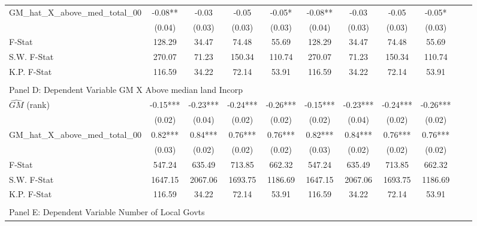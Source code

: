 \begin{table}[htbp]
\begin{threeparttable}
\begin{tabular}{l*{10}{c}}
\addlinespace
GM\_hat\_X\_above\_med\_total\_00&      -0.08** &      -0.03   &      -0.05   &      -0.05*  &      -0.08** &      -0.03   &      -0.05   &      -0.05*  \\
                &     (0.04)   &     (0.03)   &     (0.03)   &     (0.03)   &     (0.04)   &     (0.03)   &     (0.03)   &     (0.03)   \\
\midrule
F-Stat          &     128.29   &      34.47   &      74.48   &      55.69   &     128.29   &      34.47   &      74.48   &      55.69   \\
S.W. F-Stat     &     270.07   &      71.23   &     150.34   &     110.74   &     270.07   &      71.23   &     150.34   &     110.74   \\
K.P. F-Stat     &     116.59   &      34.22   &      72.14   &      53.91   &     116.59   &      34.22   &      72.14   &      53.91   \\
\cmidrule[\heavyrulewidth](lr){1-9} \\ \cmidrule[\heavyrulewidth](lr){1-9}
\multicolumn{8}{l}{Panel D: Dependent Variable GM X Above median land Incorp}\\
\cmidrule(lr){1-9}
$\hat{GM}$ (rank)&      -0.15***&      -0.23***&      -0.24***&      -0.26***&      -0.15***&      -0.23***&      -0.24***&      -0.26***\\
                &     (0.02)   &     (0.04)   &     (0.02)   &     (0.02)   &     (0.02)   &     (0.04)   &     (0.02)   &     (0.02)   \\
\addlinespace
GM\_hat\_X\_above\_med\_total\_00&       0.82***&       0.84***&       0.76***&       0.76***&       0.82***&       0.84***&       0.76***&       0.76***\\
                &     (0.03)   &     (0.02)   &     (0.02)   &     (0.02)   &     (0.03)   &     (0.02)   &     (0.02)   &     (0.02)   \\
\midrule
F-Stat          &     547.24   &     635.49   &     713.85   &     662.32   &     547.24   &     635.49   &     713.85   &     662.32   \\
S.W. F-Stat     &    1647.15   &    2067.06   &    1693.75   &    1186.69   &    1647.15   &    2067.06   &    1693.75   &    1186.69   \\
K.P. F-Stat     &     116.59   &      34.22   &      72.14   &      53.91   &     116.59   &      34.22   &      72.14   &      53.91   \\
\cmidrule[\heavyrulewidth](lr){1-9} \\ \cmidrule[\heavyrulewidth](lr){1-9}
\multicolumn{8}{l}{Panel E: Dependent Variable Number of Local Govts}\\

\end{tabular}
\end{threeparttable}
\end{table}

